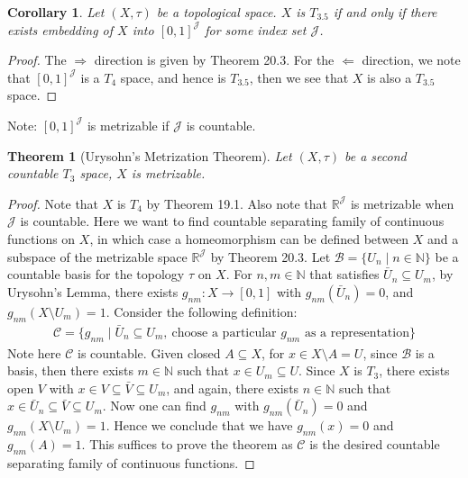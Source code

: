 \documentclass[11pt]{book}
\theoremstyle{break}
\theoremstyle{break}
\newtheorem{thm}{Theorem}[section]
\newtheorem{corT}[lem]{Corollary}
\newcommand{\R}{\mathbb{R}}
\newcommand{\N}{\mathbb{N}}
\newcommand{\note}{\color{red}Note: \color{black}}
\begin{document}
\begin{corT}
Let $(X,\tau)$ be a topological space. $X$ is $T_{3.5}$ if and only if there exists embedding of $X$ into $[0,1]^{\mathcal{J}}$ for some index set $\mathcal{J}$. 
\end{corT}
\begin{proof}
The $\Rightarrow$ direction is given by Theorem 20.3. For the $\Leftarrow$ direction, we note that $[0,1]^\mathcal{J}$ is a $T_4$ space, and hence is $T_{3.5}$, then we see that $X$ is also a $T_{3.5}$ space. 
\end{proof}

\note $[0,1]^{\mathcal{J}}$ is metrizable if $\mathcal{J}$ is countable. 


\begin{thm}[Urysohn's Metrization Theorem]
Let $(X,\tau)$ be a second countable $T_3$ space, $X$ is metrizable.  
\end{thm}
\begin{proof}
Note that $X$ is $T_4$ by Theorem 19.1. Also note that $\R^{\mathcal{J}}$ is metrizable when $\mathcal{J}$ is countable. Here we want to find countable separating family of continuous functions on $X$, in which case a homeomorphism can be defined between $X$ and a subspace of the metrizable space $\R^{\mathcal{J}}$ by Theorem 20.3. Let $\mathcal{B} = \{U_n \mid  n \in \N\}$ be a countable basis for the topology $\tau$ on $X$. For $n,m \in \N$ that satisfies $\bar{U}_n \subseteq U_m$, by Urysohn's Lemma, there exists $g_{nm}:X \to [0,1]$ with $g_{nm}(\bar{U}_n)  = 0$, and $g_{nm}(X\setminus U_m)=1$. Consider the following definition:
\begin{align*}
\mathcal{C} = \{g_{nm} \mid \bar{U}_n \subseteq U_m, \ \text{choose a particular }g_{nm}\text{ as a representation}\}
\end{align*}
Note here $\mathcal{C}$ is countable. Given closed $A\subseteq X$, for $x \in X\setminus A = U$, since $\mathcal{B}$ is a basis, then there exists $m \in \N$ such that $x \in U_m \subseteq U$. Since $X$ is $T_3$, there exists open $V$ with $x \in V \subseteq \bar{V} \subseteq U_m$, and again, there exists $n \in \N$ such that $x \in \bar{U}_n \subseteq \bar{V} \subseteq U_m$. Now one can find $g_{nm}$ with $g_{nm}(\bar{U}_n) = 0$ and $g_{nm}(X\setminus U_m) = 1$. Hence we conclude that we have $g_{nm}(x) = 0$ and $g_{nm}(A) = 1$. This suffices to prove the theorem as $\mathcal{C}$ is the desired countable separating family of continuous functions. 
\end{proof}
\end{document}
